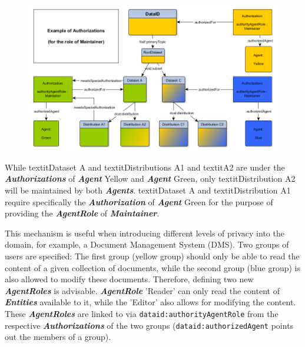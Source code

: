 \documentclass[a4paper,english,twoside,BCOR1.5cm,headsepline,DIV12,appendixprefix,final,12pt]{scrbook}
\newcommand{\prop}[1]{{{\texttt{#1}}}}
\newcommand{\important}[1]{\textbf{\textit{#1}}}
\begin{document}
\begin{figure}[!htbp]
\centering
  \includegraphics[width=\textwidth]{images/AuthorizationExample5.png}
  \label{fig:dlaxioms}
\end{figure}

While textit{Dataset A} and textit{Distributions A1} and textit{A2} are under the \important{Authorizations} of \important{Agent} Yellow and \important{Agent} Green, only textit{Distribution A2} will be maintained by both \important{Agents}. textit{Dataset A} and textit{Distribution A1} require specifically the \important{Authorization} of \important{Agent} Green for the purpose of providing the \important{AgentRole} of \important{Maintainer}.

This mechanism is useful when introducing different levels of privacy into the domain, for example, a Document Management System (DMS). Two groups of users are specified: The first group (yellow group) should only be able to read the content of a given collection of documents, while the second group (blue group) is also allowed to modify these documents. Therefore, defining two new \important{AgentRoles} is advisable. \important{AgentRole} 'Reader' can only read the content of \important{Entities} available to it, while the 'Editor' also allows for modifying the content. These \important{AgentRoles} are linked to via \prop{dataid:authorityAgentRole} from the respective \important{Authorizations} of the two groups (\prop{dataid:authorizedAgent} points out the members of a group).
\end{document}

